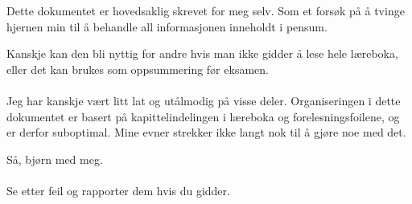 Dette dokumentet er hovedsaklig skrevet for meg selv.
Som et forsøk på å tvinge hjernen min til å behandle all informasjonen
inneholdt i pensum.

Kanskje kan den bli nyttig for andre hvis man ikke gidder å lese hele læreboka,
eller det kan brukes som oppsummering før eksamen.
\\\\
Jeg har kanskje vært litt lat og utålmodig på visse deler.
Organiseringen i dette dokumentet er basert på kapittelindelingen i læreboka
og forelesningsfoilene, og er derfor suboptimal.
Mine evner strekker ikke langt nok til å gjøre noe med det.

Så, bjørn med meg.
\\\\
Se etter feil og rapporter dem hvis du gidder.
